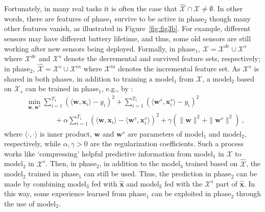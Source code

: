 \documentclass[review,11pt]{ReportTemplate}
\begin{document}
Fortunately, in many real tasks it is often the case that $\hat{\mathcal{X}} \cap \mathcal{X} \neq \emptyset$. In other words, there are features of phase$_1$ survive to be active in phase$_2$ though many other features vanish, as illustrated in Figure~\ref{fig:fig3b}. For example, different sensors may have different battery lifetime, and thus, some old sensors are still working after new sensors being deployed. Formally, in phase$_1$, $\mathcal{X} = \mathcal{X}^{de} \cup \mathcal{X}^{s}$ where $\mathcal{X}^{de}$ and $\mathcal{X}^{s}$ denote the decremental and survived feature sets, respectively; in phase$_2$, $\hat{\mathcal{X}} = \mathcal{X}^{s} \cup \mathcal{X}^{in}$ where $\mathcal{X}^{in}$ denotes the incremental feature set. As $\mathcal{X}^{s}$ is shared in both phases, in addition to training a model$_1$ from $\mathcal{X}$, a model$_2$ based on $\mathcal{X}_{s}$ can be trained in phase$_1$, e.g., by \cite{Hou:Zhou2018}:
\begin{equation}
\begin{split}
&\min\limits_{\bm{w},\bm{w}^{s}} \sum\limits_{i=1}^{T_1}\left(\langle\bm{w},\bm{x}_i\rangle - y_i\right)^{2} + \sum\limits_{i=1}^{T_1}\left(\langle\bm{w}^{s},\bm{x}_i^{s}\rangle - y_i\right)^{2} \\
& \qquad \qquad + \alpha \sum\limits_{i=1}^{T_1}\left(\langle\bm{w},\bm{x}_i\rangle - \langle\bm{w}^{s},\bm{x}_i^{s}\rangle\right)^{2}
+ \gamma \left( \|\bm{w}\|^{2} + \|\bm{w}^{s}\|^{2} \right) \ ,
\end{split}
\end{equation}
where $\langle \cdot, \cdot \rangle$ is inner product, $\bm{w}$ and $\bm{w}^{s}$ are parameters of model$_1$ and model$_2$, respectively, while $\alpha, \gamma > 0$ are the regularization coefficients. Such a process works like `compressing' helpful predictive information from model$_1$ in $\mathcal{X}$ to model$_2$ in $\mathcal{X}^{s}$. Then, in phase$_2$, in addition to the model$_3$ trained based on $\hat{\mathcal{X}}$, the model$_2$ trained in phase$_1$ can still be used. Thus, the prediction in phase$_2$ can be made by combining model$_3$ fed with $\hat{\bm x}$ and model$_2$ fed with the $\mathcal{X}^{s}$ part of $\hat{\bm x}$. In this way, some experience learned from phase$_1$ can be exploited in phase$_2$ through the use of model$_2$.
\end{document}
